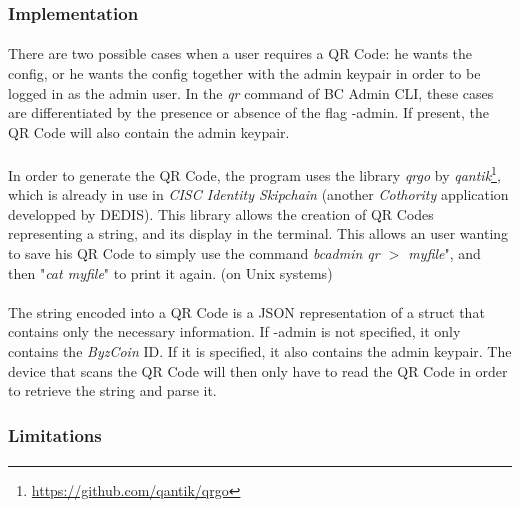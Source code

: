 \subsubsection{Implementation}

\paragraph{}

There are two possible cases when a user requires a QR Code: he wants the config, or he wants the config together with the admin keypair in order to be logged in as the admin user. In the \textit{qr} command of BC Admin CLI, these cases are differentiated by the presence or absence of the flag -admin. If present, the QR Code will also contain the admin keypair.

\paragraph{}

In order to generate the QR Code, the program uses the library \textit{qrgo} by \textit{qantik}\footnote{\url{https://github.com/qantik/qrgo}}, which is already in use in \textit{CISC Identity Skipchain} (another \textit{Cothority} application developped by DEDIS). This library allows the creation of QR Codes representing a string, and its display in the terminal. This allows an user wanting to save his QR Code to simply use the command \textit{bcadmin qr $>$ myfile}", and then "\textit{cat myfile}" to print it again. (on Unix systems) 

\paragraph{}

The string encoded into a QR Code is a JSON representation of a struct that contains only the necessary information. If -admin is not specified, it only contains the \textit{ByzCoin} ID. If it is specified, it also contains the admin keypair. The device that scans the QR Code will then only have to read the QR Code in order to retrieve the string and parse it.

\subsubsection{Limitations}
\label{subsection443}

\paragraph{}


